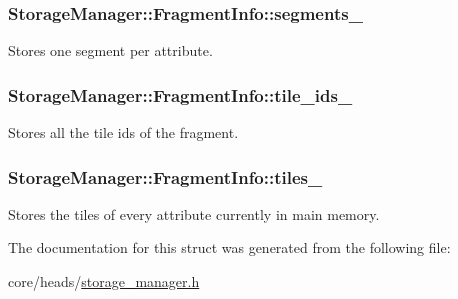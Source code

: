 \subsubsection[{segments\+\_\+}]{ Storage\+Manager\+::\+Fragment\+Info\+::segments\+\_\+}\label{structStorageManager_1_1FragmentInfo_a218cabe8c985b3d51a71b1a09946f766}
Stores one segment per attribute. \hypertarget{structStorageManager_1_1FragmentInfo_ab777a66655150bbdcd6b3b86cc747b92}{}
\subsubsection[{tile\+\_\+ids\+\_\+}]{ Storage\+Manager\+::\+Fragment\+Info\+::tile\+\_\+ids\+\_\+}\label{structStorageManager_1_1FragmentInfo_ab777a66655150bbdcd6b3b86cc747b92}
Stores all the tile ids of the fragment. \hypertarget{structStorageManager_1_1FragmentInfo_afc7f64387b6a937071865b891dc951ca}{}
\subsubsection[{tiles\+\_\+}]{ Storage\+Manager\+::\+Fragment\+Info\+::tiles\+\_\+}\label{structStorageManager_1_1FragmentInfo_afc7f64387b6a937071865b891dc951ca}
Stores the tiles of every attribute currently in main memory. 

The documentation for this struct was generated from the following file\+:\begin{DoxyCompactItemize}
\item 
core/heads/\hyperlink{storage__manager_8h}{storage\+\_\+manager.\+h}\end{DoxyCompactItemize}
